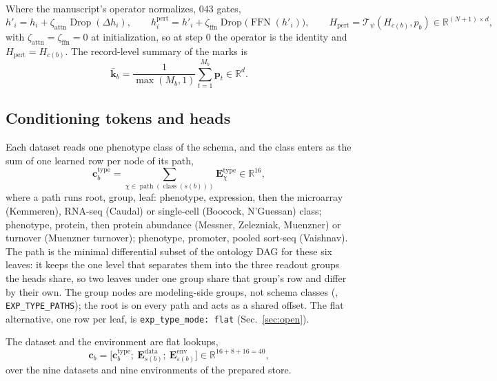 Where the manuscript's operator normalizes, 043 gates,
\begin{equation}
h'_i = h_i + \zeta_{\mathrm{attn}} \operatorname{Drop}(\Delta h_i),
\qquad
h^{\mathrm{pert}}_i = h'_i + \zeta_{\mathrm{ffn}} \operatorname{Drop}\big(\operatorname{FFN}(h'_i)\big),
\qquad
H_{\mathrm{pert}} = \mathcal{T}_\psi(H_{c(b)}, p_b) \in \mathbb{R}^{(N+1) \times d},
\label{eq:rezero}
\end{equation}
with $\zeta_{\mathrm{attn}} = \zeta_{\mathrm{ffn}} = 0$ at initialization, so at step 0 the
operator is the identity and $H_{\mathrm{pert}} = H_{c(b)}$. The record-level summary of the
marks is
\begin{equation}
\bar{\mathbf{k}}_b = \frac{1}{\max(M_b, 1)} \sum_{t=1}^{M_b} \mathbf{p}_t \in \mathbb{R}^{d}.
\label{eq:summary}
\end{equation}

\subsection{Conditioning tokens and heads}
\label{sec:heads}

Each dataset reads one phenotype class of the schema, and the class enters as the sum of
one learned row per node of its path,
\begin{equation}
\mathbf{c}^{\mathrm{type}}_b = \sum_{\chi \in \operatorname{path}(\operatorname{class}(s(b)))} \mathbf{E}^{\mathrm{type}}_{\chi} \in \mathbb{R}^{16},
\label{eq:typetoken}
\end{equation}
where a path runs root, group, leaf: phenotype, expression, then the microarray (Kemmeren),
RNA-seq (Caudal) or single-cell (Boocock, N'Guessan) class; phenotype, protein, then protein
abundance (Messner, Zelezniak, Muenzner) or turnover (Muenzner turnover); phenotype,
promoter, pooled sort-seq (Vaishnav). The path is the minimal differential subset of the
ontology DAG for these six leaves: it keeps the one level that separates them into the three
readout groups the heads share, so two leaves under one group share that group's row and
differ by their own. The group nodes are modeling-side groups, not schema classes
(, \texttt{EXP\_TYPE\_PATHS}); the root is on every path and acts as a
shared offset. The flat alternative, one row per leaf, is \texttt{exp\_type\_mode: flat}
(Sec.~\ref{sec:open}).

The dataset and the environment are flat lookups,
\begin{equation}
\mathbf{c}_b = \big[\mathbf{c}^{\mathrm{type}}_b ;\ \mathbf{E}^{\mathrm{data}}_{s(b)} ;\ \mathbf{E}^{\mathrm{env}}_{\varepsilon(b)}\big] \in \mathbb{R}^{16 + 8 + 16 = 40},
\label{eq:cond}
\end{equation}
over the nine datasets and nine environments of the prepared store.

